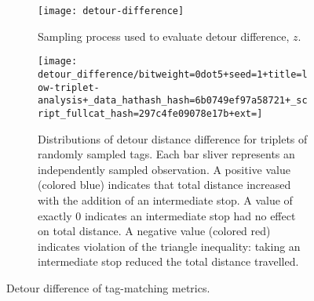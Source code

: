 \begin{figure}
\begin{center}

\begin{minipage}{\linewidth}
\begin{subfigure}[b]{\linewidth}
\begin{minipage}{0.5\textwidth}
\begin{center}
\texttt{[image: detour-difference]}
\end{center}
\end{minipage}%
\begin{minipage}{0.5\textwidth}
\caption{
Sampling process used to evaluate detour difference, $z$.
} \label{fig:detour_difference_cartoon}
\end{minipage}
\end{subfigure}
\end{minipage}

\begin{minipage}{\linewidth}
\begin{subfigure}[b]{\linewidth}
\texttt{[image: detour\_difference/bitweight=0dot5+seed=1+title=low-triplet-analysis+\_data\_hathash\_hash=6b0749ef97a58721+\_script\_fullcat\_hash=297c4fe09078e17b+ext=]}
\caption{
Distributions of detour distance difference for triplets of randomly sampled tags.
Each bar sliver represents an independently sampled observation.
A positive value (colored blue) indicates that total distance increased with the addition of an intermediate stop.
A value of exactly 0 indicates an intermediate stop had no effect on total distance.
A negative value (colored red) indicates violation of the triangle inequality: taking an intermediate stop reduced the total distance travelled.
} \label{fig:detour_difference_distribution}

\end{subfigure}
\end{minipage}

\caption{
Detour difference of tag-matching metrics.
}
\label{fig:detour_difference}

\end{center}
\end{figure}
